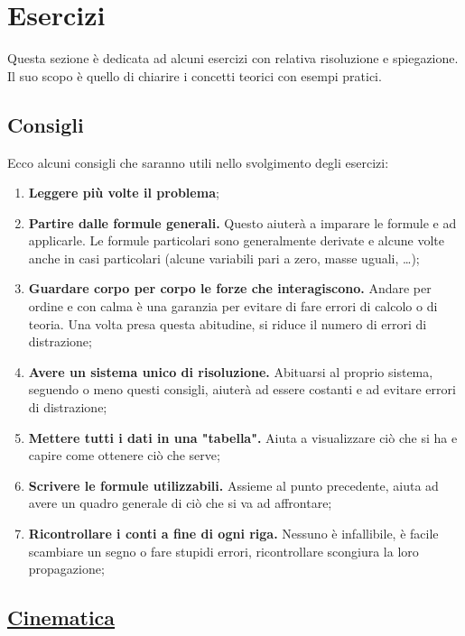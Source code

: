 
\section{Esercizi}
Questa sezione è dedicata ad alcuni esercizi con relativa risoluzione e spiegazione. Il suo scopo
è quello di chiarire i concetti teorici con esempi pratici.

\subsection*{Consigli}
Ecco alcuni consigli che saranno utili nello svolgimento degli esercizi:
\begin{enumerate}
  \item \textbf{Leggere più volte il problema};
  \item \textbf{Partire dalle formule generali.} Questo aiuterà a imparare le formule e ad 
    applicarle. Le formule particolari sono generalmente derivate e alcune volte anche in casi 
    particolari (alcune variabili pari a zero, masse uguali, \ldots);
  \item \textbf{Guardare corpo per corpo le forze che interagiscono.} Andare per ordine e con calma 
    è una garanzia per evitare di fare errori di calcolo o di teoria. Una volta presa
    questa abitudine, si riduce il numero di errori di distrazione;
  \item \textbf{Avere un sistema unico di risoluzione.} Abituarsi al proprio sistema, seguendo o 
    meno questi consigli, aiuterà ad essere costanti e ad evitare errori di distrazione;
  \item \textbf{Mettere tutti i dati in una "tabella".} Aiuta a visualizzare ciò che si ha e capire
    come ottenere ciò che serve;
  \item \textbf{Scrivere le formule utilizzabili.} Assieme al punto precedente, aiuta ad avere un
    quadro generale di ciò che si va ad affrontare;
  \item \textbf{Ricontrollare i conti a fine di ogni riga.} Nessuno è infallibile, è facile 
    scambiare un segno o fare stupidi errori, ricontrollare scongiura la loro propagazione;
\end{enumerate}

\subsection*{\hyperref[sec:cinematica]{Cinematica}}\label{ex:cinematica}

